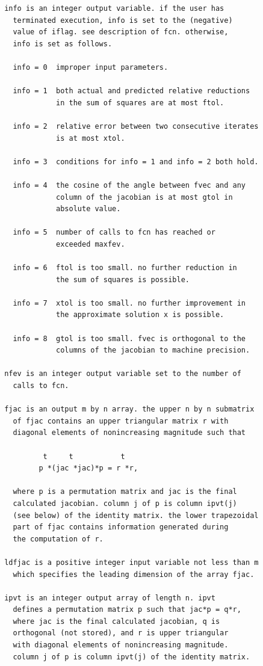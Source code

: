 \documentclass[11pt,twoside]{article}
\begin{document}
\begin{verbatim}
       info is an integer output variable. if the user has
         terminated execution, info is set to the (negative)
         value of iflag. see description of fcn. otherwise,
         info is set as follows.

         info = 0  improper input parameters.

         info = 1  both actual and predicted relative reductions
                   in the sum of squares are at most ftol.

         info = 2  relative error between two consecutive iterates
                   is at most xtol.

         info = 3  conditions for info = 1 and info = 2 both hold.

         info = 4  the cosine of the angle between fvec and any
                   column of the jacobian is at most gtol in
                   absolute value.

         info = 5  number of calls to fcn has reached or
                   exceeded maxfev.

         info = 6  ftol is too small. no further reduction in
                   the sum of squares is possible.

         info = 7  xtol is too small. no further improvement in
                   the approximate solution x is possible.

         info = 8  gtol is too small. fvec is orthogonal to the
                   columns of the jacobian to machine precision.

       nfev is an integer output variable set to the number of
         calls to fcn.

       fjac is an output m by n array. the upper n by n submatrix
         of fjac contains an upper triangular matrix r with
         diagonal elements of nonincreasing magnitude such that

                t     t           t
               p *(jac *jac)*p = r *r,

         where p is a permutation matrix and jac is the final
         calculated jacobian. column j of p is column ipvt(j)
         (see below) of the identity matrix. the lower trapezoidal
         part of fjac contains information generated during
         the computation of r.

       ldfjac is a positive integer input variable not less than m
         which specifies the leading dimension of the array fjac.

       ipvt is an integer output array of length n. ipvt
         defines a permutation matrix p such that jac*p = q*r,
         where jac is the final calculated jacobian, q is
         orthogonal (not stored), and r is upper triangular
         with diagonal elements of nonincreasing magnitude.
         column j of p is column ipvt(j) of the identity matrix.


\end{verbatim}
\end{document}
